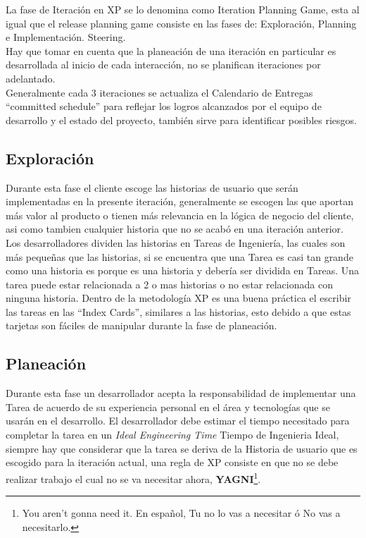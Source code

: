       La fase de Iteración en XP se lo denomina como Iteration Planning Game, esta al igual que  el release planning game consiste en las fases de: Exploración, Planning e Implementaci\'on. Steering.\\

      Hay que tomar en cuenta que la planeación de una iteración en particular es desarrollada al inicio de cada interacción, no se planifican iteraciones por adelantado.\\

      Generalmente cada 3 iteraciones se actualiza el Calendario de Entregas “committed schedule” para reflejar los logros alcanzados por el equipo de desarrollo y el estado del proyecto, también sirve para identificar posibles riesgos.\\

      \subsection{Exploración}
      \label{sub:exploracion}

      Durante esta fase el cliente escoge las historias de usuario que serán implementadas en la presente iteración, generalmente se escogen las que aportan más valor al producto o tienen más relevancia en la lógica de negocio del cliente, asi como tambien cualquier historia que no se acabó en una iteración anterior.\\

      Los desarrolladores dividen las historias en Tareas de Ingeniería, las cuales son más pequeñas que las historias, si se encuentra que una Tarea es casi tan grande como una historia es porque es una historia y debería ser dividida en Tareas. Una tarea puede estar relacionada a 2 o mas historias o no estar relacionada con ninguna historia. Dentro de la metodología XP es una buena práctica el escribir las tareas en las  “Index Cards”, similares a las historias, esto debido a que estas tarjetas son fáciles de manipular durante la fase de planeación.\\


      \subsection{Planeación}
      \label{sub:planeacion}

      Durante esta fase un desarrollador acepta la responsabilidad de implementar una Tarea de acuerdo de su experiencia personal en el área y tecnologías que se usarán en el desarrollo. El desarrollador debe estimar el tiempo necesitado para completar la tarea en un \emph{Ideal Engineering Time} Tiempo de Ingenieria Ideal, siempre hay que considerar que la tarea se deriva de la Historia de usuario que es escogido para la iteración actual, una regla de XP consiste en que no se debe realizar trabajo el cual no se va necesitar ahora, \textbf{YAGNI}\footnote{You aren't gonna need it. En espa\~nol, Tu no lo vas a necesitar \'o No vas a necesitarlo.}.\\

